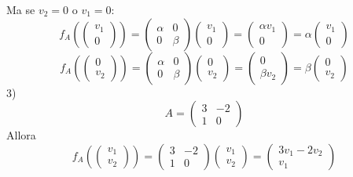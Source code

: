 \documentclass[12pt]{article}
\begin{document}
Ma se $v_2 = 0$ o $v_1 = 0$:
\[f_A\left(\begin{pmatrix}
    v_1\\
    0
\end{pmatrix}\right) = \begin{pmatrix}
    \alpha & 0\\
    0 & \beta
\end{pmatrix} \begin{pmatrix}
    v_1\\
    0
\end{pmatrix} = \begin{pmatrix}
    \alpha v_1\\
    0
\end{pmatrix} = \alpha \begin{pmatrix}
    v_1\\
    0
\end{pmatrix}\]
\[f_A\left(\begin{pmatrix}
    0\\
    v_2
\end{pmatrix}\right) = \begin{pmatrix}
    \alpha & 0\\
    0 & \beta
\end{pmatrix} \begin{pmatrix}
    0\\
    v_2
\end{pmatrix} = \begin{pmatrix}
    0\\
    \beta v_2
\end{pmatrix} = \beta\begin{pmatrix}
    0\\
    v_2
\end{pmatrix}\]
3)
\[A = \begin{pmatrix}
    3 & -2\\
    1 & 0
\end{pmatrix}\]
Allora
\[f_A\left(\begin{pmatrix}
    v_1\\
    v_2
\end{pmatrix}\right) = \begin{pmatrix}
    3 & -2\\
    1 & 0
\end{pmatrix}\begin{pmatrix}
    v_1\\
    v_2
\end{pmatrix} = \begin{pmatrix}
    3v_1 - 2v_2\\
    v_1
\end{pmatrix}\]
\end{document}
